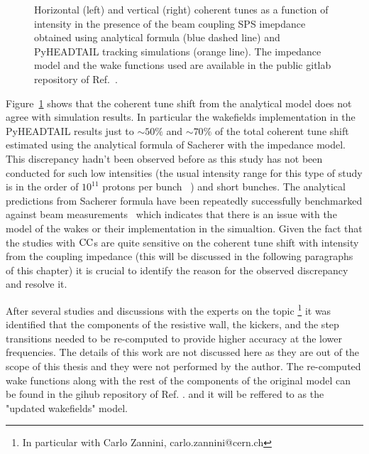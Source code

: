 \begin{figure}[!ht]
\begin{subfigure}[t]{0.45\textwidth}
    \end{subfigure}
    \hfill
     \caption{Horizontal (left) and vertical (right) coherent tunes as a function of intensity in the presence of the beam coupling SPS imepdance obtained using analytical formula (blue dashed line) and PyHEADTAIL tracking simulations (orange line). The impedance model and the wake functions used are available in the public gitlab repository of Ref.~\cite{sps_impedance_model_git}.} %
     \label{fig:sps_coherent_DQ_vs_intensity_original_complete_model}
 \end{figure}

 Figure~\ref{fig:sps_coherent_DQ_vs_intensity_original_complete_model} shows that the coherent tune shift from the analytical model does not agree with simulation results. In particular the wakefields implementation in the PyHEADTAIL results just to $\sim 50 \%$ and $\sim 70 \%$ of the total coherent tune shift estimated using the analytical formula of Sacherer with the impedance model. This discrepancy hadn't been observed before as this study has not been conducted for such low intensities (the usual intensity range for this type of study is in the order of $10^{11}$ protons per bunch ~\cite{Beck:2683038}) and short bunches. %
 The analytical predictions from Sacherer formula have been repeatedly successfully benchmarked against beam measurements~\cite{Bartosik:1742183, sps_impedance_measurements_vs_model} which indicates that there is an issue with the model of the wakes or their implementation in the simualtion. Given the fact that the studies with ${\mathrm{CC}}$s are quite sensitive on the coherent tune shift with intensity from the coupling impedance (this will be discussed in the following paragraphs of this chapter) it is crucial to identify the reason for the observed discrepancy and resolve it.

 After several studies and discussions with the experts on the topic \footnote{In particular with Carlo Zannini, carlo.zannini@cern.ch} it was identified that the components of the resistive wall, the kickers, and the step transitions needed to be re-computed to provide higher accuracy at the lower frequencies. The details of this work are not discussed here as they are out of the scope of this thesis and they were not performed by the author. The re-computed wake functions along with the rest of the components of the original model can be found in the gihub repository of Ref. . and it will be reffered to as the "updated wakefields" model.

